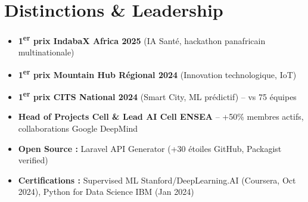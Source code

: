 \documentclass[a4paper,11pt]{article}
\begin{document}
\section{Distinctions \& Leadership}
\begin{itemize}[leftmargin=*, label=\tiny$\bullet$, nosep]
    \item \small{\textbf{1\textsuperscript{er} prix IndabaX Africa 2025} (IA Sant\'e, hackathon panafricain multinationale)}
    \item \small{\textbf{1\textsuperscript{er} prix Mountain Hub R\'egional 2024} (Innovation technologique, IoT)}
    \item \small{\textbf{1\textsuperscript{er} prix CITS National 2024} (Smart City, ML pr\'edictif) -- vs 75 \'equipes}
    \item \small{\textbf{Head of Projects Cell \& Lead AI Cell ENSEA} -- +50\% membres actifs, collaborations Google DeepMind}
    \item \small{\textbf{Open Source :} Laravel API Generator (+30 \'etoiles GitHub, Packagist verified)}
    \item \small{\textbf{Certifications :} Supervised ML Stanford/DeepLearning.AI (Coursera, Oct 2024), Python for Data Science IBM (Jan 2024)}
\end{itemize}
\end{document}
